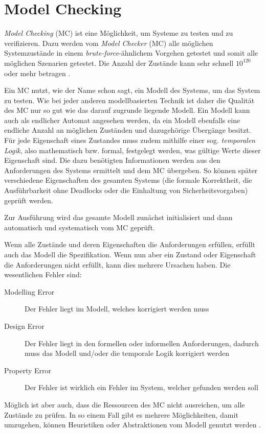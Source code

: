 \section{Model Checking}\label{sec:modelchecking}

\emph{Model Checking} (MC) ist eine Möglichkeit, um Systeme zu testen und zu verifizieren. Dazu werden vom \emph{Model Checker} (MC) alle möglichen Systemzustände in einem \emph{brute-force}-ähnlichem Vorgehen getestet und somit alle möglichen Szenarien getestet. Die Anzahl der Zustände kann sehr schnell $ 10^{120} $ oder mehr betragen \cite{Grumberg1999,Baier2008}.


Ein MC nutzt, wie der Name schon sagt, ein Modell des Systems, um das System zu testen. Wie bei jeder anderen modellbasierten Technik ist daher die Qualität des MC nur so gut wie das darauf zugrunde liegende Modell. Ein Modell kann auch als endlicher Automat angesehen werden, da ein Modell ebenfalls eine endliche Anzahl an möglichen Zuständen und dazugehörige Übergänge besitzt. Für jede Eigenschaft eines Zustandes muss zudem mithilfe einer sog. \emph{temporalen Logik}, also mathematisch bzw. formal, festgelegt werden, was gültige Werte dieser Eigenschaft sind. Die dazu benötigten Informationen werden aus den Anforderungen des Systems ermittelt und dem MC übergeben. So können später verschiedene Eigenschaften des gesamten Systems (\zB die formale Korrektheit, die Ausführbarkeit ohne Deadlocks oder die Einhaltung von Sicherheitsvorgaben) geprüft werden.

Zur Ausführung wird das gesamte Modell zunächst initialisiert und dann automatisch und systematisch vom MC geprüft.

Wenn alle Zustände und deren Eigenschaften die Anforderungen erfüllen, erfüllt auch das Modell die Spezifikation. Wenn nun aber ein Zustand oder Eigenschaft die Anforderungen nicht erfüllt, kann dies mehrere Ursachen haben. Die wesentlichen Fehler sind:

\begin{description}
	\item[Modelling Error] Der Fehler liegt im Modell, welches korrigiert werden muss
	\item[Design Error] Der Fehler liegt in den formellen oder informellen Anforderungen, dadurch muss das Modell und/oder die temporale Logik korrigiert werden
	\item[Property Error] Der Fehler ist wirklich ein Fehler im System, welcher gefunden werden soll
\end{description}

Möglich ist aber auch, dass die Ressourcen des MC nicht ausreichen, um alle Zustände zu prüfen. In so einem Fall gibt es mehrere Möglichkeiten, damit umzugehen, \zB können Heuristiken oder Abstraktionen vom Modell genutzt werden \cite{Leucker2008,Eberhardinger2016}.